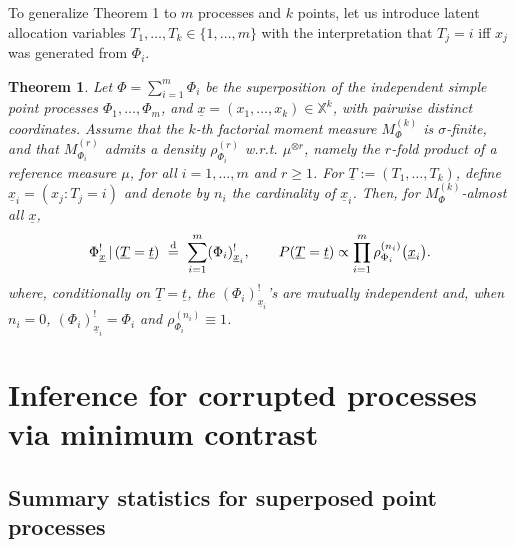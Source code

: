 \documentclass[11pt,a4paper,oneside]{article}
\newcommand{\deq}{\stackrel{\mbox{\scriptsize d}}{=}}
\newcommand{\X}{\mathbb{X}}
\renewcommand{\mid}{\ensuremath{\,|\,}}
\newtheorem{theorem}{Theorem}
\theoremstyle{definition}
\theoremstyle{remark}
\begin{document}
To generalize Theorem 1 to $m$ processes and $k$ points, let us introduce latent allocation variables $T_1,\ldots,T_k\in\{1,\ldots,m\}$ with the interpretation that $T_j=i$ iff $x_j$ was generated from $\Phi_i$. 
\begin{theorem}\label{teo:multiple}
Let $\Phi=\sum_{i=1}^m \Phi_i$ be the superposition of the independent simple point processes $\Phi_1,\ldots,\Phi_m$, and $\underline{x}=(x_1,\ldots,x_k)\in \X^k$, with pairwise distinct coordinates. Assume that the $k$-th factorial moment measure $M_{\Phi}^{(k)}$ is $\sigma$-finite, and that $M_{\Phi_i}^{(r)}$ admits a density $\rho_{\Phi_i}^{(r)}$ w.r.t. $\mu^{\otimes r}$, namely the $r$-fold product of a reference measure $\mu$, for all $i=1, \ldots , m$ and $r\geq 1$.
For $\underline{T} := (T_1,\ldots,T_k)$, define $\underline{x}_i = ( x_j: T_j = i )$ and denote by $n_i$  the cardinality of $\underline{x}_i$.
Then, for $M_{\Phi}^{(k)}$-almost all $\underline{x}$,
\[
    \Phi^!_{\underline{x}}\mid (\underline{T}=\underline{t})\ \deq\ \sum_{i=1}^m (\Phi_i)^!_{\underline{x}_{i} }, \qquad P(\underline{T}=\underline{t})\propto \prod_{i=1}^m \rho_{\Phi_i}^{(n_i)} \big(\underline {x}_i \big).
\]
where, conditionally on $\underline{T}=\underline{t}$, the $(\Phi_i)^!_{\underline{x}_{i} }$'s are mutually independent and, when $n_i=0$,  $(\Phi_i)^!_{\underline{x}_{i} } = \Phi_i$ and $\rho_{\Phi_i}^{(n_i)} \equiv 1$.
\end{theorem}






\section{Inference for corrupted processes via minimum contrast} \label{sec:corruzione}

\subsection{Summary statistics for superposed point processes} \label{sec:summary_stat}
\end{document}
